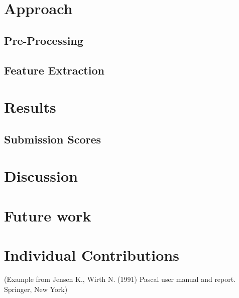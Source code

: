 \documentclass[runningheads,a4paper]{llncs}
\begin{document}
\section{Approach}
\subsection{Pre-Processing}
\subsection{Feature Extraction}
\section{Results}
\subsection{Submission Scores}
\section{Discussion}
\section{Future work}
\section{Individual Contributions}

\medskip


{\small (Example from Jensen K., Wirth N. (1991) Pascal user manual and
report. Springer, New York)}


\nocite{*} 
\end{document}
